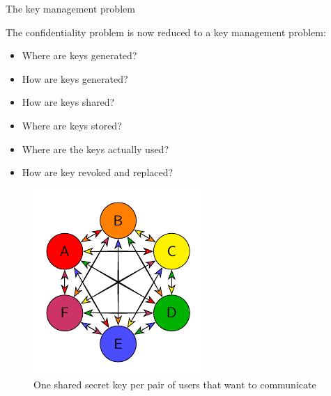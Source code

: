 \documentclass[aspectratio=169, lualatex, handout, 10pt,dvipsnames,svgnames]{beamer} %
\begin{document}
\begin{frame}{The key management problem}

  The confidentiality problem is now reduced to a key management problem:\medskip
  
  \begin{minipage}{0.525\linewidth}
    \begin{itemize}
    \item Where are keys generated?\medskip
      
    \item How are keys generated?\medskip
      
    \item How are keys shared?\medskip
      
    \item Where are keys stored?\medskip
      
    \item Where are the keys actually used?\medskip
      
    \item How are key revoked and replaced? 
    \end{itemize}
  \end{minipage}
  \begin{minipage}{0.45\linewidth}
      \begin{figure}[c]
        \centering
        \includegraphics[scale=1]{Images/SKD.pdf}
        \caption*{One shared secret key per pair of users that want to communicate}
      \end{figure}
  \end{minipage}

  
\end{frame}
\end{document}
